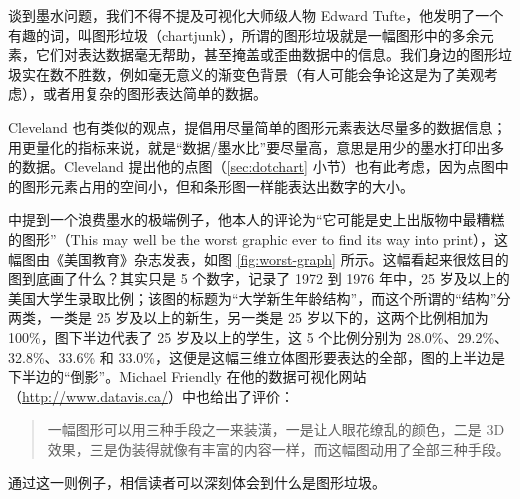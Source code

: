 \documentclass[
  b5paper,
  UTF8,twoside]{book}
\begin{document}
谈到墨水问题，我们不得不提及可视化大师级人物 Edward Tufte，他发明了一个有趣的词，叫图形垃圾（chartjunk），所谓的图形垃圾就是一幅图形中的多余元素，它们对表达数据毫无帮助，甚至掩盖或歪曲数据中的信息。我们身边的图形垃圾实在数不胜数，例如毫无意义的渐变色背景（有人可能会争论这是为了美观考虑），或者用复杂的图形表达简单的数据。

Cleveland 也有类似的观点，提倡用尽量简单的图形元素表达尽量多的数据信息；用更量化的指标来说，就是``数据/墨水比''要尽量高，意思是用少的墨水打印出多的数据。Cleveland 提出他的点图（\ref{sec:dotchart} 小节）也有此考虑，因为点图中的图形元素占用的空间小，但和条形图一样能表达出数字的大小。

\citet{Tufte01} 中提到一个浪费墨水的极端例子，他本人的评论为``它可能是史上出版物中最糟糕的图形''（This may well be the worst graphic ever to find its way into print），这幅图由《美国教育》杂志发表，如图 \ref{fig:worst-graph} 所示。这幅看起来很炫目的图到底画了什么？其实只是 5 个数字，记录了 1972 到 1976 年中，25 岁及以上的美国大学生录取比例；该图的标题为``大学新生年龄结构''，而这个所谓的``结构''分两类，一类是 25 岁及以上的新生，另一类是 25 岁以下的，这两个比例相加为 100\%，图下半边代表了 25 岁及以上的学生，这 5 个比例分别为 28.0\%、29.2\%、32.8\%、33.6\% 和 33.0\%，这便是这幅三维立体图形要表达的全部，图的上半边是下半边的``倒影''。Michael Friendly 在他的数据可视化网站（\url{http://www.datavis.ca/}）中也给出了评价：

\begin{quote}
一幅图形可以用三种手段之一来装潢，一是让人眼花缭乱的颜色，二是 3D 效果，三是伪装得就像有丰富的内容一样，而这幅图动用了全部三种手段。
\end{quote}

通过这一则例子，相信读者可以深刻体会到什么是图形垃圾。
\end{document}
